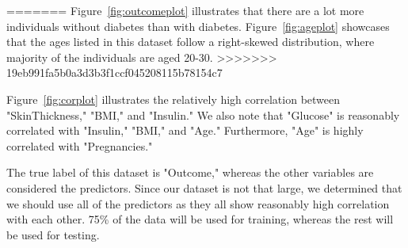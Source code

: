 \documentclass[12pt]{article}
\begin{document}
\begin{enumerate}
	
	
		
		
		
		
		
	
	
	
		
		
		
		
		
	
	
	
		
		
		
		
		
		
\end{enumerate}
 
=======
Figure~\ref{fig:outcomeplot} illustrates that there are a lot more individuals without diabetes than with diabetes. Figure~\ref{fig:ageplot} showcases that the ages listed in this dataset follow a right-skewed distribution, where majority of the individuals are aged 20-30.
>>>>>>> 19eb991fa5b0a3d3b3f1ccf045208115b78154c7

Figure~\ref{fig:corplot} illustrates the relatively high correlation between "SkinThickness," "BMI," and "Insulin." We also note that "Glucose" is reasonably correlated with "Insulin," "BMI," and "Age." Furthermore, "Age" is highly correlated with "Pregnancies."

The true label of this dataset is "Outcome," whereas the other variables are considered the predictors. Since our dataset is not that large, we determined that we should use all of the predictors as they all show reasonably high correlation with each other. 75\% of the data will be used for training, whereas the rest will be used for testing.
\end{document}
